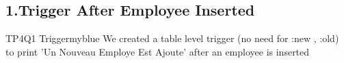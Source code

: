 \subsection*{1.Trigger After Employee Inserted}


\begin{prettyBox}{TP4Q1 Trigger}{myblue}
We created a table level trigger (no need for :new , :old) to print 'Un Nouveau Employe Est Ajoute' after an employee is inserted 
\end{prettyBox}

\vspace{0.25cm}
